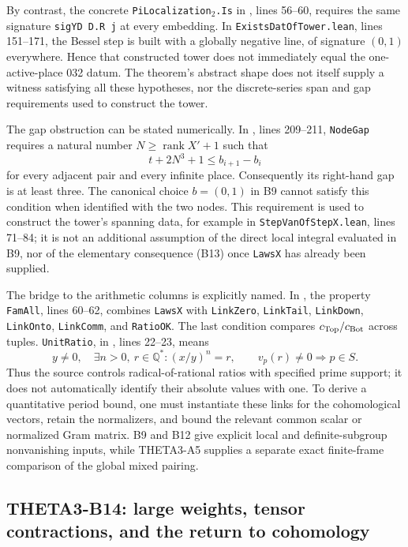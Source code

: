 \documentclass[11pt]{article}
\newcommand{\Q}{\mathbb Q}\newcommand{\C}{\mathbb C}\newcommand{\Z}{\mathbb Z}\newcommand{\R}{\mathbb R}\newcommand{\A}{\mathbb A}\newcommand{\OO}{\mathcal O}
\theoremstyle{definition}\newtheorem{definition}[theorem]{Definition}\newtheorem{remark}[theorem]{Remark}
\begin{document}
By contrast, the concrete \texttt{PiLocalization$_2$.Is} in
, lines 56--60, requires the same signature \texttt{sigYD D.R j} at every embedding. In \texttt{ExistsDatOfTower.lean}, lines 151--171, the Bessel step is built with a globally negative line, of signature $(0,1)$ everywhere. Hence that constructed tower does not immediately equal the one-active-place 032 datum. The theorem's abstract shape does not itself supply a witness satisfying all these hypotheses, nor the discrete-series span and gap requirements used to construct the tower.

The gap obstruction can be stated numerically. In , lines 209--211, \texttt{NodeGap} requires a natural number $N\geq\operatorname{rank}X'+1$ such that
\[
 t+2N^3+1\leq b_{i+1}-b_i
\]
for every adjacent pair and every infinite place. Consequently its right-hand gap is at least three. The canonical choice $b=(0,1)$ in B9 cannot satisfy this condition when identified with the two nodes. This requirement is used to construct the tower's spanning data, for example in \texttt{StepVanOfStepX.lean}, lines 71--84; it is not an additional assumption of the direct local integral evaluated in B9, nor of the elementary consequence (B13) once \texttt{LawsX} has already been supplied.

The bridge to the arithmetic columns is explicitly named. In
, the property
\texttt{FamAll}, lines 60--62, combines \texttt{LawsX} with
\texttt{LinkZero}, \texttt{LinkTail}, \texttt{LinkDown},
\texttt{LinkOnto}, \texttt{LinkComm}, and \texttt{RatioOK}.
The last condition compares $c_{\rm Top}/c_{\rm Bot}$ across tuples.
\texttt{UnitRatio}, in , lines 22--23, means
\[
 y\ne0,\quad \exists n>0,\ r\in\Q^*:
 (x/y)^n=r,
 \qquad v_p(r)\ne0\Longrightarrow p\in S.
\]
Thus the source controls radical-of-rational ratios with specified prime support; it does not automatically identify their absolute values with one. To derive a quantitative period bound, one must instantiate these links for the cohomological vectors, retain the normalizers, and bound the relevant common scalar or normalized Gram matrix. B9 and B12 give explicit local and definite-subgroup nonvanishing inputs, while THETA3-A5 supplies a separate exact finite-frame comparison of the global mixed pairing.

\subsection{THETA3-B14: large weights, tensor contractions, and the return to cohomology}\label{B14}
\end{document}
